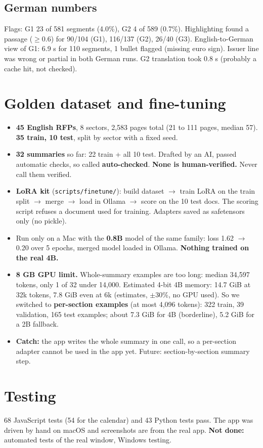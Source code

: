 \subsection{German numbers}
Flags: G1 23 of 581 segments (4.0\%), G2 4 of 589 (0.7\%). Highlighting found a passage ($\ge$0.6) for 90/104 (G1), 116/137 (G2), 26/40 (G3). English-to-German view of G1: 6.9 s for 110 segments, 1 bullet flagged (missing euro sign). Issuer line was wrong or partial in both German runs. G2 translation took 0.8 s (probably a cache hit, not checked).

\section{Golden dataset and fine-tuning}
\begin{itemize}
\item \textbf{45 English RFPs}, 8 sectors, 2,583 pages total (21 to 111 pages, median 57). \textbf{35 train, 10 test}, split by sector with a fixed seed.
\item \textbf{32 summaries} so far: 22 train + all 10 test. Drafted by an AI, passed automatic checks, so called \textbf{auto-checked}. \textbf{None is human-verified.} Never call them verified.
\item \textbf{LoRA kit} (\texttt{scripts/finetune/}): build dataset $\rightarrow$ train LoRA on the train split $\rightarrow$ merge $\rightarrow$ load in Ollama $\rightarrow$ score on the 10 test docs. The scoring script refuses a document used for training. Adapters saved as safetensors only (no pickle).
\item Run only on a Mac with the \textbf{0.8B} model of the same family: loss 1.62 $\rightarrow$ 0.20 over 5 epochs, merged model loaded in Ollama. \textbf{Nothing trained on the real 4B.}
\item \textbf{8 GB GPU limit.} Whole-summary examples are too long: median 34,597 tokens, only 1 of 32 under 14,000. Estimated 4-bit 4B memory: 14.7 GiB at 32k tokens, 7.8 GiB even at 6k (estimates, $\pm$30\%, no GPU used). So we switched to \textbf{per-section examples} (at most 4,096 tokens): 322 train, 39 validation, 165 test examples; about 7.3 GiB for 4B (borderline), 5.2 GiB for a 2B fallback.
\item \textbf{Catch:} the app writes the whole summary in one call, so a per-section adapter cannot be used in the app yet. Future: section-by-section summary step.
\end{itemize}

\section{Testing}
68 JavaScript tests (54 for the calendar) and 43 Python tests pass. The app was driven by hand on macOS and screenshots are from the real app. \textbf{Not done:} automated tests of the real window, Windows testing.

